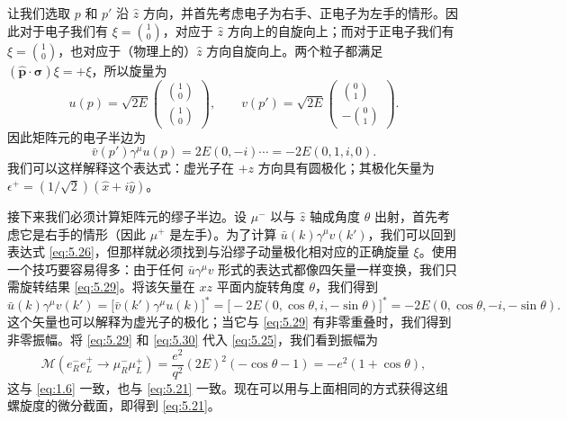 让我们选取 $p$ 和 $p'$ 沿 $\hat{z}$ 方向，并首先考虑电子为右手、正电子为左手的情形。因此对于电子我们有 $\xi = \binom{1}{0}$，对应于 $\hat{z}$ 方向上的自旋向上；而对于正电子我们有 $\xi = \binom{1}{0}$，也对应于（物理上的）$\hat{z}$ 方向自旋向上。两个粒子都满足 $(\hat{\mathbf{p}}\cdot\bm{\sigma})\xi = +\xi$，所以旋量为
\begin{equation}
  u(p) = \sqrt{2E}\begin{pmatrix}\binom{1}{0}\\ \binom{1}{0}\end{pmatrix},
  \qquad v(p') = \sqrt{2E}\begin{pmatrix}\binom{0}{1}\\ -\binom{0}{1}\end{pmatrix}.
  \label{eq:5.28}
\end{equation}
因此矩阵元的电子半边为
\begin{equation}
  \bar{v}(p')\gamma^\mu u(p) = 2E(0, -i)\cdots = -2E(0, 1, i, 0) .
  \label{eq:5.29}
\end{equation}
我们可以这样解释这个表达式：虚光子在 $+z$ 方向具有圆极化；其极化矢量为 $\epsilon^{+} = (1/\sqrt{2})(\hat{x}+i\hat{y})$。

接下来我们必须计算矩阵元的缪子半边。设 $\mu^{-}$ 以与 $\hat{z}$ 轴成角度 $\theta$ 出射，首先考虑它是右手的情形（因此 $\mu^{+}$ 是左手）。为了计算 $\bar{u}(k)\gamma^\mu v(k')$，我们可以回到表达式 \eqref{eq:5.26}，但那样就必须找到与沿缪子动量极化相对应的正确旋量 $\xi$。使用一个技巧要容易得多：由于任何 $\bar{u}\gamma^\mu v$ 形式的表达式都像四矢量一样变换，我们只需旋转结果 \eqref{eq:5.29}。将该矢量在 $xz$ 平面内旋转角度 $\theta$，我们得到
\begin{equation}
  \bar{u}(k)\gamma^\mu v(k') = \bigl[ \bar{v}(k')\gamma^\mu u(k) \bigr]^{*}
    = \bigl[ -2E(0, \cos\theta, i, -\sin\theta) \bigr]^{*}
    = -2E(0, \cos\theta, -i, -\sin\theta) .
  \label{eq:5.30}
\end{equation}
这个矢量也可以解释为虚光子的极化；当它与 \eqref{eq:5.29} 有非零重叠时，我们得到非零振幅。将 \eqref{eq:5.29} 和 \eqref{eq:5.30} 代入 \eqref{eq:5.25}，我们看到振幅为
\begin{equation}
  \mathcal{M}(e^{-}_R e^{+}_L \to \mu^{-}_R\mu^{+}_L)
    = \frac{e^2}{q^2}(2E)^2(-\cos\theta - 1) = -e^2(1+\cos\theta),
  \label{eq:5.31}
\end{equation}
这与 \eqref{eq:1.6} 一致，也与 \eqref{eq:5.21} 一致。现在可以用与上面相同的方式获得这组螺旋度的微分截面，即得到 \eqref{eq:5.21}。

